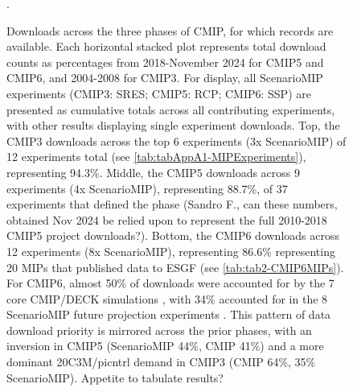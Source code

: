 \documentclass[gmd, preprint]{copernicus}
\newcommand{\mycomment}[1]{}
\def\cred#1{{\color{red}#1}}
\begin{document}
\begin{figure}
    \centering
    
    \caption{Downloads across the three phases of CMIP, for which records are available. Each horizontal stacked plot represents total download counts as percentages from 2018-November 2024 for CMIP5 and CMIP6, and 2004-2008 for CMIP3. For display, all ScenarioMIP experiments (CMIP3: SRES; CMIP5: RCP; CMIP6: SSP) are presented as cumulative totals across all contributing experiments, with other results displaying single experiment downloads. Top, the CMIP3 \citep{meehl_wcrp_2007} downloads across the top 6 experiments (3x ScenarioMIP) of 12 experiments total (see \autoref{tab:tabAppA1-MIPExperiments}), representing 94.3\%. Middle, the CMIP5 downloads across 9 experiments (4x ScenarioMIP), representing 88.7\%, of 37 experiments that defined the phase \citep[representing 8 MIPs identified in \autoref{tab:tabAppA1-MIPExperiments};][]{taylor_overview_2012} (\cred{Sandro F., can these numbers, obtained Nov 2024 be relied upon to represent the full 2010-2018 CMIP5 project downloads?}). Bottom, the CMIP6 downloads across 12 experiments (8x ScenarioMIP), representing 86.6\% representing 20 MIPs that published data to ESGF (see \autoref{tab:tab2-CMIP6MIPs}). For CMIP6, almost 50\% of downloads were accounted for by the 7 core CMIP/DECK simulations \citep{eyring_overview_2016}, with 34\% accounted for in the 8 ScenarioMIP future projection experiments \citep{oneill_scenario_2016}. This pattern of data download priority is mirrored across the prior phases, with an inversion in CMIP5 (ScenarioMIP 44\%, CMIP 41\%) and a more dominant 20C3M/picntrl demand in CMIP3 (CMIP 64\%, 35\% ScenarioMIP). \cred{Appetite to tabulate results?}}.
    \mycomment{
    Old text
    Recorded downloads across the three phases of CMIP, for which download records are available. Top the CMIP3 downloads across the 12 experiments defining phase \citep{meehl_wcrp_2007}. Middle the CMIP5 downloads across the 37 experiments that defined the phase \citep[represented by the 8 MIPs identified in \autoref{tab:tabAppA1-MIPExperiments};][]{taylor_overview_2012} (\cred{Sandro F., can these numbers, obtained Nov 2024 be relied upon to represent the full 2010-2018 CMIP5 project downloads?}). And right the CMIP6 downloads, represented by the 20 MIPs that have published data to ESGF (see \autoref{tab:tab2-CMIP6MIPs}). For CMIP6, almost 50\% of downloads were accounted for by the core CMIP/DECK simulations \citep{eyring_overview_2016}, with more than 30\% accounted for in the ScenarioMIP future projection experiments \citep{oneill_scenario_2016}. This pattern of data download priority is mirrored across the prior phases, with an inversion in CMIP5 (ScenarioMIP 44\%, CMIP 41\%) and a more dominant 20C3M/picntrl demand in CMIP3 (CMIP 64\%, 35\% ScenarioMIP). \cred{Cleanup and replot; appetite to tabulate these results?}}
    \label{fig:fig5-MIPDownloads}
\end{figure}
\end{document}
